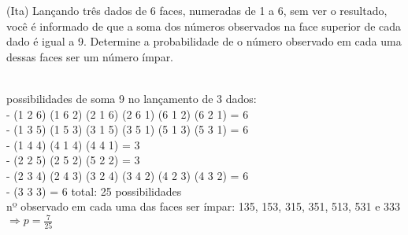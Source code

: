 \begin{ex}
   (Ita) Lançando três dados de 6 faces, numeradas de 1 a 6, sem ver o resultado, você é informado de que a soma dos números observados na face superior de cada dado é igual a 9. Determine a probabilidade de o número observado em cada uma dessas faces ser um número ímpar. 
     \begin{sol}
     \phantom{A} \\
     possibilidades de soma 9 no lançamento de 3 dados: \\
     - (1 2 6) (1 6 2) (2 1 6) (2 6 1) (6 1 2) (6 2 1) = 6\\
     - (1 3 5) (1 5 3) (3 1 5) (3 5 1) (5 1 3) (5 3 1) = 6\\
     - (1 4 4) (4 1 4) (4 4 1) = 3 \\
     - (2 2 5) (2 5 2) (5 2 2) = 3 \\
     - (2 3 4) (2 4 3) (3 2 4) (3 4 2) (4 2 3) (4 3 2) = 6 \\
     - (3 3 3) = 6 \hspace{0,4cm} total: 25 possibilidades \\
     nº observado em cada uma das faces ser ímpar: 135, 153, 315, 351, 513, 531 e 333\\
     $\Longrightarrow p=\frac{7}{25}$
     \end{sol}
  \end{ex}